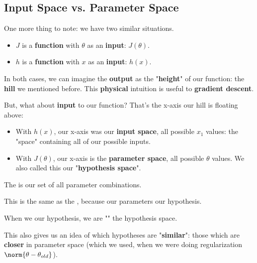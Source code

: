 \subsection*{Input Space vs. Parameter Space}

    One more thing to note: we have two similar situations.
    
    \begin{itemize}
        \item $J$ is a \textbf{function} with $\theta$ as an \textbf{input}: $J(\theta)$.
        
        \item $h$ is a \textbf{function} with $x$ as an \textbf{input}: $h(x)$. 
    \end{itemize}
    
    In both cases, we can imagine the \textbf{output} as the "\textbf{height}" of our function: the \textbf{hill} we mentioned before. This \textbf{physical} intuition is useful to \textbf{gradient descent}.
    
    But, what about \textbf{input} to our function? That's the x-axis our hill is floating above:
    
    \begin{itemize}
        \item With $h(x)$, our x-axis was our \textbf{input space}, all possible $x_1$ values: the "space" containing all of our possible inputs.
        
        \item With $J(\theta)$, our x-axis is the \textbf{parameter space}, all possible $\theta$ values. We also called this our "\textbf{hypothesis space}".
            \\
    \end{itemize}
    
    \begin{definition}
        The  is our set of all  parameter combinations.
        
        This is the same as the , because our parameters  our hypothesis.
        
        When we  our hypothesis, we are "" the hypothesis space. 
    \end{definition}
    
    This also gives us an idea of which hypotheses are "\textbf{similar}": those which are \textbf{closer} in parameter space (which we used, when we were doing regularization $\norm{\theta-\theta_{old}}$).
    
